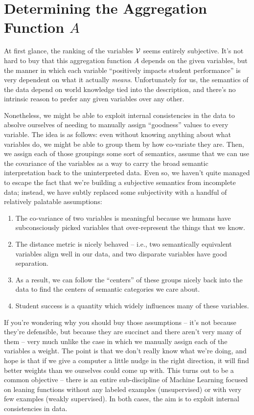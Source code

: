 \documentclass[paper.tex]{subfiles}
\begin{document}
	\section{Determining the Aggregation Function $A$}
	
	At first glance, the ranking of the variables $\mathcal{V}$ seems entirely subjective. It's not hard to buy that this aggregation function $A$ depends on the given variables, but the manner in which each variable ``positively impacts student performance'' is very dependent on what it actually \emph{means}. Unfortunately for us, the semantics of the data depend on world knowledge tied into the description, and there's no intrinsic reason to prefer any given variables over any other.
	
	Nonetheless, we might be able to exploit internal consistencies in the data to absolve ourselves of needing to manually assign ``goodness'' values to every variable. The idea is as follows: even without knowing anything about what variables do, we might be able to group them by how co-variate they are. Then, we assign each of those groupings some sort of semantics, assume that we can use the covariance of the variables as a way to carry the broad semantic interpretation back to the uninterpreted data. Even so, we haven't quite managed to escape the fact that we're building a subjective semantics from incomplete data; instead, we have subtly replaced some subjectivity with a handful of relatively palatable assumptions: 
	\begin{enumerate}
		\item The co-variance of two variables is meaningful because we humans have subconsciously picked variables that over-represent the things that we know.
		\item The distance metric is nicely behaved -- i.e., two semantically equivalent variables align well in our data, and two disparate variables have good separation.
		\item As a result, we can follow the ``centers'' of these groups nicely back into the data to find the centers of semantic categories we care about.
		\item Student success is a quantity which widely influences many of these variables.
	\end{enumerate} 
	If you're wondering why you should buy those assumptions -- it's not because they're defensible, but because they are succinct and there aren't very many of them -- very much unlike the case in which we manually assign each of the variables a weight. The point is that we don't really know what we're doing, and hope is that if we give a computer a little nudge in the right direction, it will find better weights than we ourselves could come up with. This turns out to be a common objective -- there is an entire sub-discipline of Machine Learning focused on leaning functions without any labeled examples (unsupervised) or with very few examples (weakly supervised). In both cases, the aim is to exploit internal consistencies in data.
	
\end{document}
